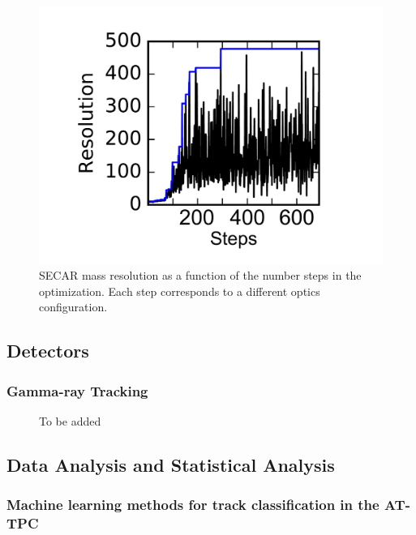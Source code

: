 \documentclass[%
10pt]{article}
\begin{document}
\begin{figure}
\centering
\includegraphics[width=0.55\linewidth]{figures/SECAR_optimization.pdf}
\caption{SECAR mass resolution as a function of the number steps in the optimization. Each step corresponds to a different optics configuration.}
\end{figure}

\clearpage
\newpage

\subsection{Detectors}
\subsubsection{Gamma-ray Tracking}
\vspace{5mm}
\noindent
{}
\begin{figure}[htb!]
\centering
\caption{To be added}
\end{figure}
\clearpage
\newpage


\subsection{Data Analysis and Statistical Analysis}

\subsubsection{Machine learning methods for track classification in the AT-TPC}
\end{document}

